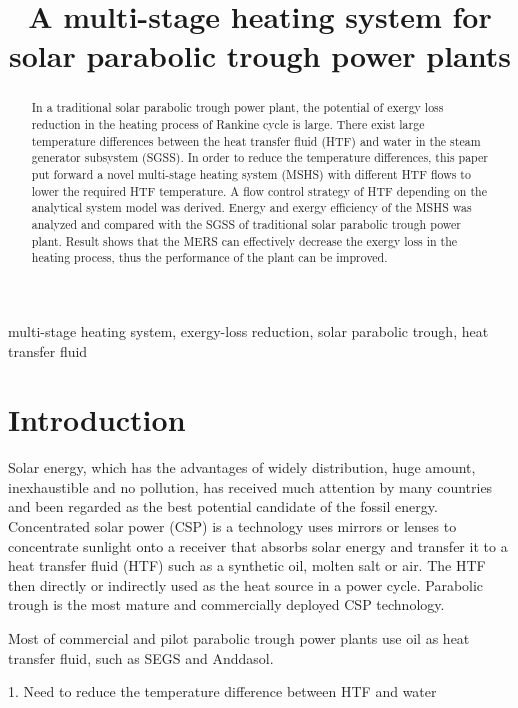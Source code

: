 \documentclass{article}
\begin{document}
\title{A multi-stage heating system for solar parabolic trough power plants}
\date{}
\author{}
\maketitle

\begin{abstract}
In a traditional solar parabolic trough power plant, the potential of exergy loss reduction in the heating process of Rankine cycle is large. There exist large temperature differences between the heat transfer fluid (HTF) and water in the steam generator subsystem (SGSS). In order to reduce the temperature differences, this paper put forward a novel multi-stage heating system (MSHS) with different HTF flows to lower the required HTF temperature. A flow control strategy of HTF depending on the analytical system model was derived. Energy and exergy efficiency of the MSHS was analyzed and compared with the SGSS of traditional solar parabolic trough power plant. Result shows that the MERS can effectively decrease the exergy loss in the heating process, thus the performance of the plant can be improved.
\end{abstract}

multi-stage heating system, exergy-loss reduction, solar parabolic trough, heat transfer fluid
\newpage{}

\linenumbers

\section{Introduction}

Solar energy, which has the advantages of widely distribution, huge amount, inexhaustible and no pollution, has received much attention by many countries and been regarded as the best potential candidate of the fossil energy.~\cite{Guo2016,Salgado2017}
Concentrated solar power (CSP) is a technology uses mirrors or lenses to concentrate sunlight onto a receiver that absorbs solar energy and transfer it to a heat transfer fluid (HTF) such as a synthetic oil, molten salt or air. The HTF then directly or indirectly used as the heat source in a power cycle.
Parabolic trough is the most mature and commercially deployed CSP technology.

Most of commercial and pilot parabolic trough power plants use oil as heat transfer fluid, such as SEGS and Anddasol.~\cite{Price2002,Liu2016}

1. Need to reduce the temperature difference between HTF and water
\end{document}
